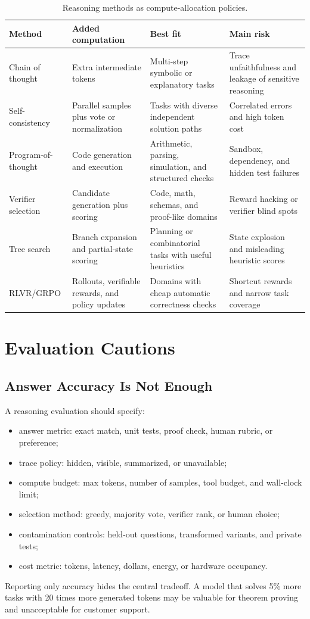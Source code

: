 \begin{table}[t]
\centering
\caption{Reasoning methods as compute-allocation policies.}
\label{tab:reasoning-method-costs}
\begin{tabular}{p{}p{}p{}p{}}
\toprule
Method & Added computation & Best fit & Main risk \\
\midrule
Chain of thought & Extra intermediate tokens & Multi-step symbolic or explanatory tasks & Trace unfaithfulness and leakage of sensitive reasoning \\
Self-consistency & Parallel samples plus vote or normalization & Tasks with diverse independent solution paths & Correlated errors and high token cost \\
Program-of-thought & Code generation and execution & Arithmetic, parsing, simulation, and structured checks & Sandbox, dependency, and hidden test failures \\
Verifier selection & Candidate generation plus scoring & Code, math, schemas, and proof-like domains & Reward hacking or verifier blind spots \\
Tree search & Branch expansion and partial-state scoring & Planning or combinatorial tasks with useful heuristics & State explosion and misleading heuristic scores \\
RLVR/GRPO & Rollouts, verifiable rewards, and policy updates & Domains with cheap automatic correctness checks & Shortcut rewards and narrow task coverage \\
\bottomrule
\end{tabular}
\end{table}

\section{Evaluation Cautions}
\subsection{Answer Accuracy Is Not Enough}
A reasoning evaluation should specify:
\begin{itemize}
    \item answer metric: exact match, unit tests, proof check, human rubric, or preference;
    \item trace policy: hidden, visible, summarized, or unavailable;
    \item compute budget: max tokens, number of samples, tool budget, and wall-clock limit;
    \item selection method: greedy, majority vote, verifier rank, or human choice;
    \item contamination controls: held-out questions, transformed variants, and private tests;
    \item cost metric: tokens, latency, dollars, energy, or hardware occupancy.
\end{itemize}
Reporting only accuracy hides the central tradeoff. A model that solves 5\% more tasks with 20 times more generated tokens may be valuable for theorem proving and unacceptable for customer support.

